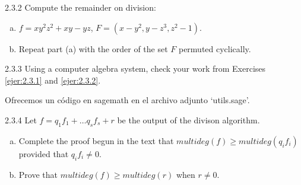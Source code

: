 \documentclass[twoside]{article}
\begin{document}
\newpage

\begin{ejercicio}{2.3.2}
Compute the remainder on division:
\begin{enumerate}[a.]
\item $f = xy^2z^2 + xy - yz$, $F = (x-y^2, y-z^3, z^2-1)$.
\item Repeat part (a) with the order of the set $F$ permuted cyclically.
\end{enumerate}
\end{ejercicio}

\newpage

\begin{ejercicio}{2.3.3}
Using a computer algebra system, check your work from Exercises \ref{ejer:2.3.1} and \ref{ejer:2.3.2}.
\end{ejercicio}
\begin{solucion}
Ofrecemos un código en sagemath en el archivo adjunto `utils.sage'.
\end{solucion}

\newpage

\begin{ejercicio}{2.3.4}
Let $f = q_1 f_1 + \dots q_s f_s + r$ be the output of the divison algorithm.
\begin{enumerate}[a.]
\item Complete the proof begun in the text that $multideg(f) ≥ multideg(q_i f_i)$ provided that $q_i f_i \neq 0$.
\item Prove that $multideg(f) ≥ multideg(r)$ when $r \neq 0$.
\end{enumerate}
\end{ejercicio}

\newpage
\end{document}
